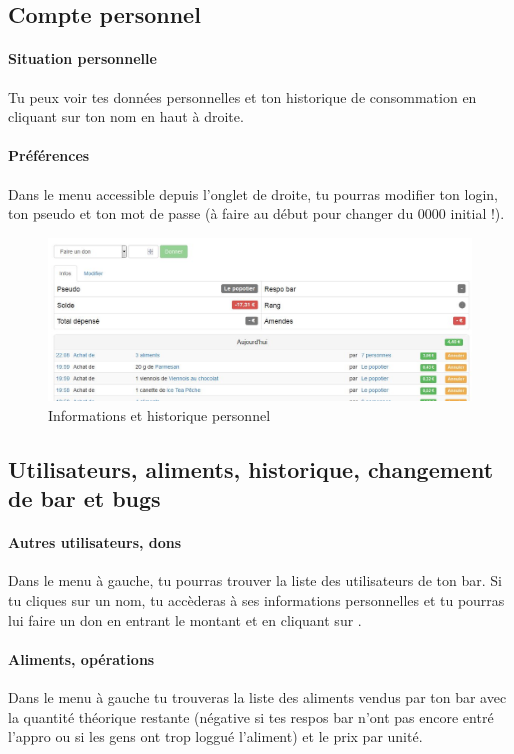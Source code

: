 \documentclass[12pt,french]{article}
\begin{document}
\subsection{Compte personnel}

\paragraph{Situation personnelle} Tu peux voir tes données personnelles et ton historique de consommation en cliquant sur ton nom en haut à droite.

\paragraph{Préférences} Dans le menu  accessible depuis l'onglet de droite, tu pourras modifier ton login, ton pseudo et ton mot de passe (à faire au début pour changer du 0000 initial !).

\begin{figure}[h]
\centering
\includegraphics[width=16cm]{images/infosperso}
\caption{Informations et historique personnel}
\end{figure}

\subsection{Utilisateurs, aliments, historique, changement de bar et bugs}

\paragraph{Autres utilisateurs, dons} Dans le menu  à gauche, tu pourras trouver la liste des utilisateurs de ton bar. Si tu cliques sur un nom, tu accèderas à ses informations personnelles et tu pourras lui faire un don en entrant le montant et en cliquant sur .

\paragraph{Aliments, opérations} Dans le menu  à gauche tu trouveras la liste des aliments vendus par ton bar avec la quantité théorique restante (négative si tes respos bar n'ont pas encore entré l'appro ou si les gens ont trop loggué l'aliment) et le prix par unité.
\end{document}
